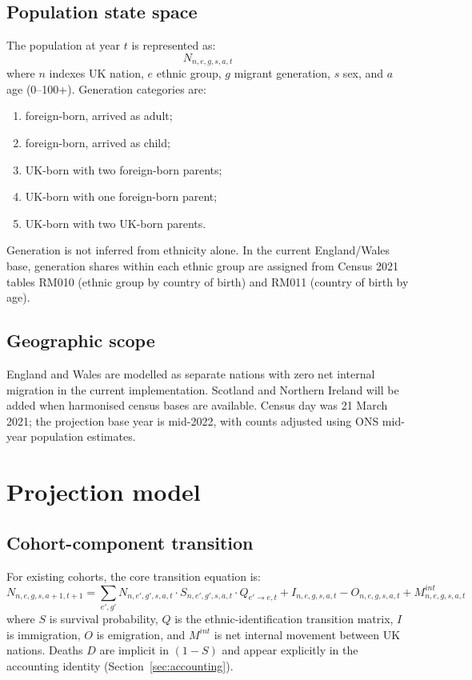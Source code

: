 \documentclass[12pt,a4paper]{article}
\begin{document}
\subsection{Population state space}

The population at year $t$ is represented as:
\begin{equation}
    N_{n,e,g,s,a,t}
    \label{eq:state}
\end{equation}
where $n$ indexes UK nation, $e$ ethnic group, $g$ migrant generation, $s$ sex, and $a$ age
(0--100+). Generation categories are:
\begin{enumerate}
    \item foreign-born, arrived as adult;
    \item foreign-born, arrived as child;
    \item UK-born with two foreign-born parents;
    \item UK-born with one foreign-born parent;
    \item UK-born with two UK-born parents.
\end{enumerate}
Generation is not inferred from ethnicity alone. In the current England/Wales base,
generation shares within each ethnic group are assigned from Census 2021 tables RM010
(ethnic group by country of birth) and RM011 (country of birth by age).

\subsection{Geographic scope}

England and Wales are modelled as separate nations with zero net internal migration in the
current implementation. Scotland and Northern Ireland will be added when harmonised census
bases are available. Census day was 21 March 2021; the projection base year is mid-2022,
with counts adjusted using ONS mid-year population estimates.

\section{Projection model}

\subsection{Cohort-component transition}

For existing cohorts, the core transition equation is:
\begin{equation}
    N_{n,e,g,s,a+1,t+1} = \sum_{e',g'} N_{n,e',g',s,a,t} \cdot S_{n,e',g',s,a,t} \cdot Q_{e' \rightarrow e,t} + I_{n,e,g,s,a,t} - O_{n,e,g,s,a,t} + M^{int}_{n,e,g,s,a,t}
    \label{eq:transition}
\end{equation}
where $S$ is survival probability, $Q$ is the ethnic-identification transition matrix,
$I$ is immigration, $O$ is emigration, and $M^{int}$ is net internal movement between UK
nations. Deaths $D$ are implicit in $(1-S)$ and appear explicitly in the accounting identity
(Section~\ref{sec:accounting}).
\end{document}
